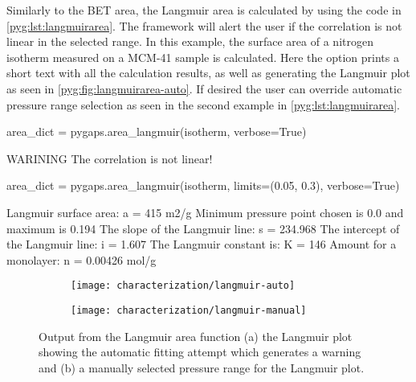 Similarly to the \gls{BET} area, the Langmuir area is calculated by using
the code in \autoref{pyg:lst:langmuirarea}. The framework will alert
the user if the correlation is not linear in the selected range.
In this example, the surface area of a nitrogen isotherm measured 
on a MCM-41 sample is calculated.
Here the  option prints a short
text with all the calculation results, as well as generating the
Langmuir plot as seen in \autoref{pyg:fig:langmuirarea-auto}.
If desired the user can override automatic pressure range selection
as seen in the second example in \autoref{pyg:lst:langmuirarea}.

\begin{samepage}
	\begin{python}[caption={Calculating a Langmuir area},label={pyg:lst:langmuirarea}]
area_dict = pygaps.area_langmuir(isotherm, verbose=True)
\end{python}
	\begin{pythonout}
WARINING The correlation is not linear!
\end{pythonout}
	\begin{python}
area_dict = pygaps.area_langmuir(isotherm, 
                                 limits=(0.05, 0.3), 
                                 verbose=True)
\end{python}
	\begin{pythonout}
Langmuir surface area: 	a = 415 m2/g
Minimum pressure point chosen is 0.0 and maximum is 0.194
The slope of the Langmuir line: 		s = 234.968
The intercept of the Langmuir line: 	i = 1.607
The Langmuir constant is:				K = 146
Amount for a monolayer: 				n = 0.00426 mol/g
\end{pythonout}
\end{samepage}

\begin{figure}[!htb]
	\centering

	\begin{subfigure}{0.45\linewidth}
		\parbox[c]{0.1\linewidth}{\caption{}%
			\label{pyg:fig:langmuirarea-auto}}
		\parbox[b]{0.85\linewidth}{%
			\texttt{[image: characterization/langmuir-auto]}}
	\end{subfigure}%
	\begin{subfigure}{0.45\linewidth}
		\parbox[c]{0.1\linewidth}{\caption{}%
			\label{pyg:fig:langmuirarea-manual}}
		\parbox[b]{0.85\linewidth}{%
			\texttt{[image: characterization/langmuir-manual]}}
	\end{subfigure}%

	\caption{Output from the Langmuir area function (a) the Langmuir plot
		showing the automatic fitting attempt which generates a warning and (b) a manually
		selected pressure range for the Langmuir plot.}%
	\label{pyg:fig:langmuirarea}

\end{figure}


